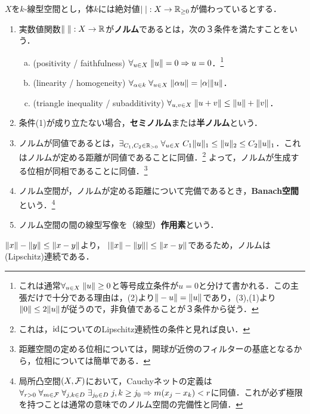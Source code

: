 \documentclass[uplatex,dvipdfmx]{jsreport}
\begin{document}
\begin{definition}
    $X$を$k$-線型空間とし，体$k$には絶対値$\lvert\;\rvert:X\to\mathbb{R}_{\ge 0}$が備わっているとする．
    \begin{enumerate}
        \item 実数値関数$\|\;\|:X\to\mathbb{R}$が\textbf{ノルム}であるとは，次の３条件を満たすことをいう．
        \begin{enumerate}[(a)]
            \item (positivity / faithfulness) $\forall_{u\in X}\;\|u\|=0\Rightarrow u=0$．\footnote{これは通常$\forall_{u\in X}\;\|u\|\ge 0$と等号成立条件が$u=0$と分けて書かれる．この主張だけで十分である理由は，(2)より$\|-u\|=\|u\|$であり，(3),(1)より$\|0\|\le 2\|u\|$が従うので，非負値であることが３条件から従う．}
            \item (linearity / homogeneity) $\forall_{\alpha\in k}\;\forall_{u\in X}\;\|\alpha u\|=\lvert\alpha\rvert\|u\|$．
            \item (triangle inequality / subadditivity) $\forall_{u,v\in X}\;\|u+v\|\le\|u\|+\|v\|$．
        \end{enumerate}
        \item 条件(1)が成り立たない場合，\textbf{セミノルム}または\textbf{半ノルム}という．
        \item ノルムが同値であるとは，$\exists_{C_1,C_2\in\mathbb{R}_{>0}}\;\forall_{u\in X}\;C_1\|u\|_1\le\|u\|_2\le C_2\|u\|_1$．これはノルムが定める距離が同値であることに同値．\footnote{これは，$\mathrm{id}$についてのLipschitz連続性の条件と見れば良い．}
        よって，ノルムが生成する位相が同相であることに同値．\footnote{距離空間の定める位相については，開球が近傍のフィルターの基底となるから，位相については簡単である．}
        \item ノルム空間が，ノルムが定める距離について完備であるとき，\textbf{Banach空間}という．\footnote{局所凸空間$(X,\mathcal{F})$において，Cauchyネットの定義は$\forall_{r>0}\;\forall_{m\in\mathcal{F}}\;\forall_{j,k\in D}\;\exists_{j_0\in D}\;j,k\ge j_0\Rightarrow m(x_j-x_k)<r$に同値．これが必ず極限を持つことは通常の意味でのノルム空間の完備性と同値．}
        \item ノルム空間の間の線型写像を（線型）\textbf{作用素}という．
    \end{enumerate}
\end{definition}
\begin{remark}
    $\|x\|-\|y\|\le\|x-y\|$より，
    $\lvert\|x\|-\|y\|\rvert\le\|x-y\|$であるため，ノルムは(Lipschitz)連続である．
\end{remark}
\end{document}
